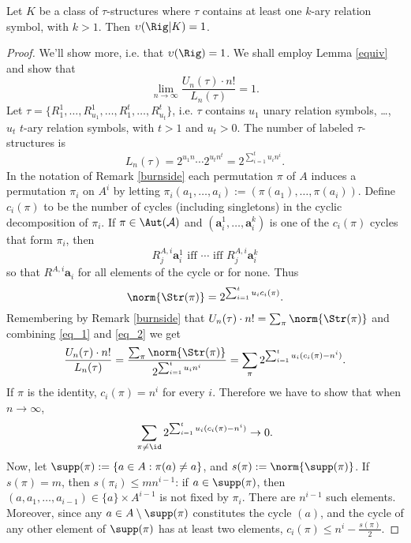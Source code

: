 \begin{lem} 
\label{rigidity} Let $K$ be a class of $\tau$-structures where $\tau$ contains at least one $k$-ary relation symbol, with $k>1$. 
Then $\upsilon(\Rig|K)=1$.
\begin{proof} We'll show more, i.e. that $\upsilon(\Rig)=1$. 
We shall employ Lemma \ref{equiv} and show that $$\lim_{n \to \infty} \frac{U_n(\tau) \cdot n!}{L_n(\tau)}=1\text{.}$$
Let $\tau=\{R^1 _1, \ldots, R^1 _{u_1}, \ldots , R^t _{1}, \ldots, R^t _{u_t}\}$, i.e. $\tau$ contains $u_1$ unary relation symbols, \ldots, $u_t$ $t$-ary relation symbols, with $t>1$ and $u_t >0$. 
The number of labeled $\tau$-structures is 
\begin{equation} 
\label{eq_1}
L_n(\tau)=2^{u_1 n} \cdots 2^{u_t n^t}=2^{\sum_{i=1}^t u_i n^i}\text{.}
\end{equation}
In the notation of Remark \ref{burnside} each permutation $\pi$ of $A$ induces a permutation $\pi_i$ on $A^i$ by letting $\pi_i(a_1,\ldots, a_i):=(\pi(a_1),\ldots, \pi(a_i))$. 
Define $c_i(\pi)$ to be the number of cycles (including singletons) in the cyclic decomposition of $\pi_i$. 
If $\pi \in \Aut(\mathcal{A})$ and $(\mathbf{a}^1 _i, \ldots, \mathbf{a}^k _i)$ is one of the $c_i(\pi)$ cycles that form $\pi_i$, then
$$ R^{A,i} _j \mathbf{a}^1 _i \text{ iff } \cdots \text{ iff } R^{A,i} _j \mathbf{a}^k _i$$ 
so that $R^{A,i} \mathbf{a} _i$ for all elements of the cycle or for none. 
Thus 
\begin{equation}
\label{eq_2}
\norm{\Str(\pi)}=2^{\sum_{i=1} ^t u_i c_i(\pi)} \text{.}
\end{equation}  
Remembering by Remark \ref{burnside} that $U_n(\tau) \cdot n!=\sum_{\pi} \norm{\Str(\pi)}$ and combining \ref{eq_1} and \ref{eq_2} we get 
$$\frac{U_n(\tau) \cdot n!}{L_n(\tau)}=\frac{\sum_{\pi}\norm{\Str(\pi)}}{2^{\sum_{i=1}^t u_i n^i}} =\sum_{\pi} 2^{\sum_{i=1} ^t u_i (c_i(\pi)-n^i)}\text{.}$$
If $\pi$ is the identity, $c_i(\pi)=n^i$ for every $i$. 
Therefore we have to show that when $n \to \infty$, 
$$\sum_{\pi \neq \id} 2^{\sum_{i=1} ^t u_i (c_i(\pi)-n^i)} \to 0\text{.}$$
Now, let $\supp(\pi):=\{a \in A: \pi(a) \neq a\}$, and $s(\pi):=\norm{\supp(\pi)}$. 
If $s(\pi)=m$, then $s(\pi_i) \le mn^{i-1}$: if $a \in \supp(\pi)$, then $(a, a_{1}, \ldots, a_{i-1}) \in \{a\}\times A^{i-1}$ is not fixed by $\pi_i$. 
There are $n^{i-1}$ such elements. 
Moreover, since any $a \in A \setminus \supp(\pi)$ constitutes the cycle $(a)$, and the cycle of any other element of $\supp(\pi)$ has at least two elements, $c_i (\pi) \le n^i - \frac{s(\pi)}{2}$. 

\end{proof}
\end{lem}
